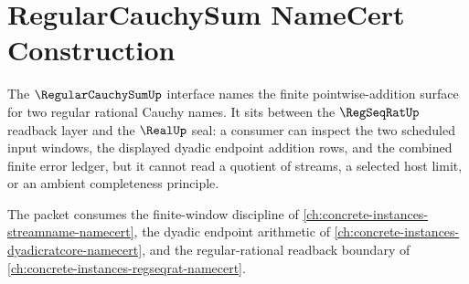 \chapter{RegularCauchySum NameCert Construction}
\label{ch:concrete-instances-regularcauchysum-namecert}

The $\RegularCauchySumUp$ interface names the finite pointwise-addition surface for two regular rational Cauchy names. It sits between the $\RegSeqRatUp$ readback layer and the $\RealUp$ seal: a consumer can inspect the two scheduled input windows, the displayed dyadic endpoint addition rows, and the combined finite error ledger, but it cannot read a quotient of streams, a selected host limit, or an ambient completeness principle.

The packet consumes the finite-window discipline of \autoref{ch:concrete-instances-streamname-namecert}, the dyadic endpoint arithmetic of \autoref{ch:concrete-instances-dyadicratcore-namecert}, and the regular-rational readback boundary of \autoref{ch:concrete-instances-regseqrat-namecert}.

